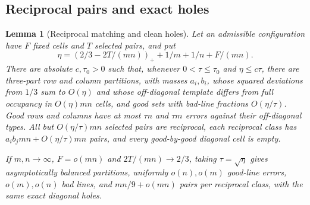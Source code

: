 \documentclass[11pt]{article}
\newtheorem{lemma}[theorem]{Lemma}
\begin{document}
\subsection{Reciprocal pairs and exact holes}
\begin{lemma}[Reciprocal matching and clean holes]\label{lem:cleanholes}
Let an admissible configuration have $F$ fixed cells and $T$ selected pairs,
and put
\[
 \eta=(2/3-2T/(mn))_++1/m+1/n+F/(mn).
\]
There are absolute $c,\tau_0>0$ such that, whenever
$0<\tau\le\tau_0$ and $\eta\le c\tau$, there are three-part row and
column partitions, with masses $a_i,b_i$, whose squared deviations from
$1/3$ sum to $O(\eta)$ and whose off-diagonal template differs from full
occupancy in $O(\eta)mn$ cells, and good sets with bad-line fractions
$O(\eta/\tau)$. Good rows and columns have at most $\tau n$ and
$\tau m$ errors against their off-diagonal types. All but
$O(\eta/\tau)mn$ selected pairs are reciprocal, each reciprocal class
has $a_i b_jmn+O(\eta/\tau)mn$ pairs, and every good-by-good diagonal
cell is empty.

If $m,n\to\infty$, $F=o(mn)$ and $2T/(mn)\to2/3$, taking $\tau=\sqrt\eta$
gives asymptotically balanced partitions, uniformly $o(n),o(m)$ good-line
errors, $o(m),o(n)$ bad lines, and $mn/9+o(mn)$ pairs per reciprocal class,
with the same exact diagonal holes.
\end{lemma}
\end{document}
